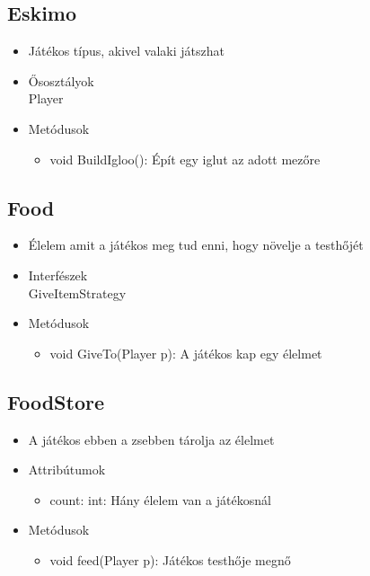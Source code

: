 \subsection{Eskimo}
\begin{itemize}
	\item Játékos típus, akivel valaki játszhat\\
	
	\item Ősosztályok\\
	Player
\item Metódusok
\begin{itemize}
	\item void BuildIgloo(): Épít egy iglut az adott mezőre
\end{itemize}
\end{itemize}

\subsection{Food}
\begin{itemize}
	\item Élelem amit a játékos meg tud enni, hogy növelje a testhőjét\\
	
\item Interfészek\\
GiveItemStrategy

\item Metódusok
\begin{itemize}
	\item void GiveTo(Player p): A játékos kap egy élelmet
\end{itemize}
\end{itemize}

\subsection{FoodStore}
\begin{itemize}
	\item A játékos ebben a zsebben tárolja az élelmet\\

\item Attribútumok\\

\begin{itemize}
	\item count: int: Hány élelem van a játékosnál

\end{itemize}
\item Metódusok\\
\begin{itemize}
	\item void feed(Player p): Játékos testhője megnő
\end{itemize}
\end{itemize}

